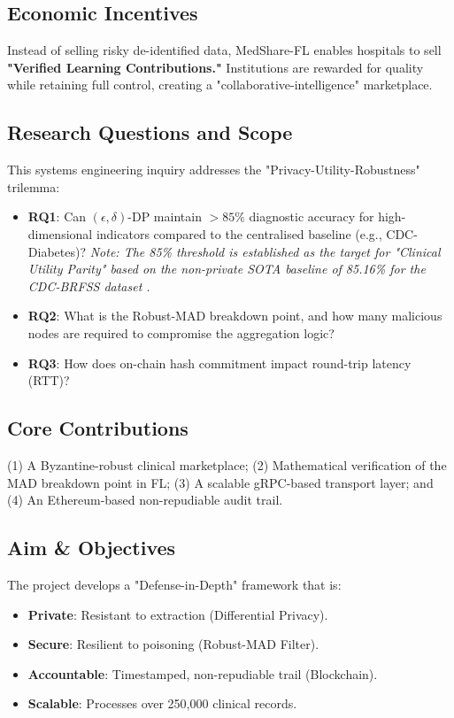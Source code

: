 \documentclass[10pt, a4paper, twocolumn]{article}
\begin{document}
\subsection{Economic Incentives}
Instead of selling risky de-identified data, MedShare-FL enables hospitals to sell \textbf{"Verified Learning Contributions."} Institutions are rewarded for quality while retaining full control, creating a "collaborative-intelligence" marketplace.

\subsection{Research Questions and Scope}
This systems engineering inquiry addresses the "Privacy-Utility-Robustness" trilemma:
\begin{itemize}[leftmargin=*, nosep]
 \item \textbf{RQ1}: Can $(\epsilon, \delta)$-DP maintain $> 85\%$ diagnostic accuracy for high-dimensional indicators compared to the centralised baseline (e.g., CDC-Diabetes)? \textit{Note: The 85\% threshold is established as the target for "Clinical Utility Parity" based on the non-private SOTA baseline of 85.16\% for the CDC-BRFSS dataset \cite{chowdhury2023}.}
\item \textbf{RQ2}: What is the Robust-MAD breakdown point, and how many malicious nodes are required to compromise the aggregation logic?
\item \textbf{RQ3}: How does on-chain hash commitment impact round-trip latency (RTT)?
\end{itemize}

\subsection{Core Contributions}
(1) A Byzantine-robust clinical marketplace; (2) Mathematical verification of the MAD breakdown point in FL; (3) A scalable gRPC-based transport layer; and (4) An Ethereum-based non-repudiable audit trail.

\subsection{Aim \& Objectives}
The project develops a "Defense-in-Depth" framework that is:
\begin{itemize}[leftmargin=*, nosep]
    \item \textbf{Private}: Resistant to extraction (Differential Privacy).
    \item \textbf{Secure}: Resilient to poisoning (Robust-MAD Filter).
    \item \textbf{Accountable}: Timestamped, non-repudiable trail (Blockchain).
    \item \textbf{Scalable}: Processes over 250,000 clinical records.
\end{itemize}
\end{document}
